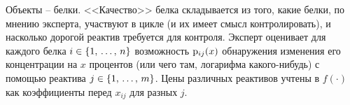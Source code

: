 Объекты -- белки. <<Качество>> белка складывается из того, какие белки, по мнению эксперта, участвуют в цикле (и их имеет смысл контролировать), и насколько дорогой реактив требуется для контроля. Эксперт оценивает для каждого белка $i \in \{1,\, \ldots,\, n\}$ возможность ${\mathrm{p}}_{ij}(x)$ обнаружения изменения его концентрации на $x$ процентов (или чего там, логарифма какого-нибудь) с помощью реактива $j \in \{1,\, \ldots,\, m\}$. Цены различных реактивов учтены в $f(\cdot)$ как коэффициенты перед $x_{ij}$ для разных $j$.




